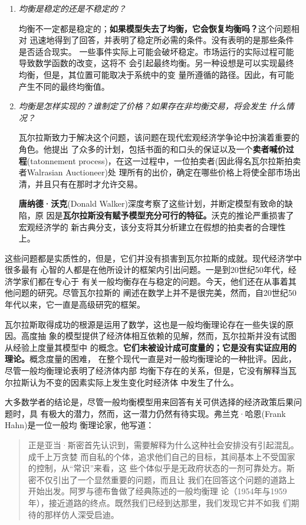 \begin{enumerate}
\item \textit{均衡是稳定的还是不稳定的？}

  均衡不一定都是稳定的；\textbf{如果模型失去了均衡，它会恢复均衡吗？}这个问题相对
  迅速地得到了回答，并表明了稳定所必需的条件。没有表明的是那些条件是否适合现实。
  一些事件实际上可能会破坏稳定。市场运行的实际过程可能导致数学函数的改变，这将不
  会引起最终均衡。另一种设想是可以实现最终均衡，但是，其位置可能取决于系统中的变
  量所遵循的路径。因此，有可能产生不同的最终均衡值。

\item \textit{均衡是怎样实现的？谁制定了价格？如果存在非均衡交易，将会发生
什么情况？}

瓦尔拉斯致力于解决这个问题，该问题在现代宏观经济学争论中扮演着重要的角色。他提出
了众多的计划，包括书面的和口头的保证以及一个\textbf{卖者喊价过程}(tatonnement
process)，在这一过程中，一位拍卖者(因此得名瓦尔拉斯拍卖者Walrasian Auctioneer)处
理所有的出价，确定在哪些价格上将使全部市场出清，并且只有在那时才允许交易。

\textbf{唐纳德·沃克}(Donald Walker)深度考察了这些计划，并断定模型有致命的缺陷，原
因是\textbf{瓦尔拉斯没有赋予模型充分可行的特征。}沃克的推论严重损害了宏观经济学的
新古典分支，该分支将其分析建立在假想的拍卖者的合理性上。

\end{enumerate}

这些问题都是实质性的，但是，它们并没有损害到瓦尔拉斯的成就。现代经济学中很多最有
心智的人都是在他所设计的框架内引出问题。一是到20世纪50年代，经济学家们都在专心于
有关一般均衡存在与稳定的问题。今天，他们还在从事着其他问题的研究。尽管瓦尔拉斯的
阐述在数学上并不是很完美，然而，自20世纪50年代以来，它一直是高级研究的框架。

瓦尔拉斯取得成功的根源是运用了数学，这也是一般均衡理论存在一些失误的原因。高度抽
象的模型提供了经济体相互依赖的见解，然而，瓦尔拉斯并没有试图从经验上度量其模型中
的概念。\textbf{它们未被设计成可度量的；它是没有实证应用的理论。}概念度量的困难，
在整个现代一直是对一般均衡理论的一种批评。因此，尽管一般均衡理论表明了经济体内部
均衡下存在的关系，但是，它没有解释当瓦尔拉斯认为不变的因素实际上发生变化时经济体
中发生了什么。

大多数学者的结论是，尽管一般均衡模型用来回答有关可供选择的经济政策后果问题时，具
有极大的潜力，然而，这一潜力仍然有待实现。弗兰克·哈恩(Frank Hahn)是一位一般均
衡理论家，他写道：

\begin{quotation}
  正是亚当·斯密首先认识到，需要解释为什么这种社会安排没有引起混乱。成千上万贪婪
  而自私的个体，追求他们自己的目标，其间基本上不受国家的控制，从“常识”来看，这
  些个体似乎是无政府状态的一剂可靠处方。斯密不仅引出了一个显然重要的问题，而且让
  我们在回答这个问题的道路上开始出发。阿罗与德布鲁做了经典陈述的一般均衡理
  论（1954年与1959年），接近道路的终点。既然我们已经到达那里，我们发现它并不如我
  们期待的那样仿人深受启迪。
\end{quotation}


